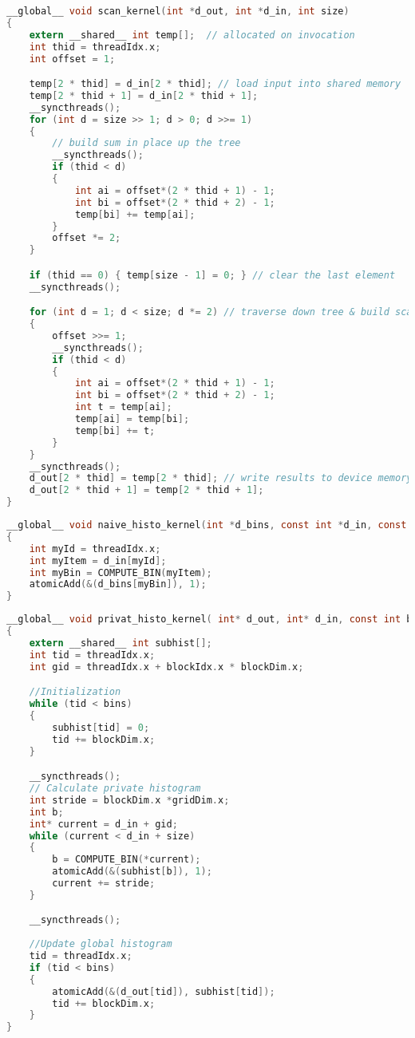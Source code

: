 \begin{lstlisting}[language=C,caption={Blelloch scan kernel},label=lst:blelloch_scan_kernel]
__global__ void scan_kernel(int *d_out, int *d_in, int size)
{
    extern __shared__ int temp[];  // allocated on invocation
    int thid = threadIdx.x;
    int offset = 1;

    temp[2 * thid] = d_in[2 * thid]; // load input into shared memory
    temp[2 * thid + 1] = d_in[2 * thid + 1];
    __syncthreads();
    for (int d = size >> 1; d > 0; d >>= 1)
    {
        // build sum in place up the tree
        __syncthreads();
        if (thid < d)
        {
            int ai = offset*(2 * thid + 1) - 1;
            int bi = offset*(2 * thid + 2) - 1;
            temp[bi] += temp[ai];
        }
        offset *= 2;
    }

    if (thid == 0) { temp[size - 1] = 0; } // clear the last element
    __syncthreads();

    for (int d = 1; d < size; d *= 2) // traverse down tree & build scan
    {
        offset >>= 1;
        __syncthreads();
        if (thid < d)
        {
            int ai = offset*(2 * thid + 1) - 1;
            int bi = offset*(2 * thid + 2) - 1;
            int t = temp[ai];
            temp[ai] = temp[bi];
            temp[bi] += t;
        }
    }
    __syncthreads();
    d_out[2 * thid] = temp[2 * thid]; // write results to device memory
    d_out[2 * thid + 1] = temp[2 * thid + 1];
}
\end{lstlisting}

\begin{lstlisting}[language=C,caption={Naive histogram kernel},label=lst:naive_histogram_kernel]
__global__ void naive_histo_kernel(int *d_bins, const int *d_in, const int BIN_COUNT)
{
    int myId = threadIdx.x;
    int myItem = d_in[myId];
    int myBin = COMPUTE_BIN(myItem);
    atomicAdd(&(d_bins[myBin]), 1);
}
\end{lstlisting}

\begin{lstlisting}[language=C,caption={Histogram by privatization kernel },label=lst:histogram_by_privatization_kernel]
__global__ void privat_histo_kernel( int* d_out, int* d_in, const int bins, int size)
{
    extern __shared__ int subhist[];
    int tid = threadIdx.x;
    int gid = threadIdx.x + blockIdx.x * blockDim.x;

    //Initialization
    while (tid < bins)
    {
        subhist[tid] = 0;
        tid += blockDim.x;
    }

    __syncthreads();
    // Calculate private histogram
    int stride = blockDim.x *gridDim.x;
    int b;
    int* current = d_in + gid;
    while (current < d_in + size)
    {
        b = COMPUTE_BIN(*current);
        atomicAdd(&(subhist[b]), 1);
        current += stride;
    }

    __syncthreads();
    
    //Update global histogram
    tid = threadIdx.x;
    if (tid < bins)
    {
        atomicAdd(&(d_out[tid]), subhist[tid]);
        tid += blockDim.x;
    }
}
\end{lstlisting}